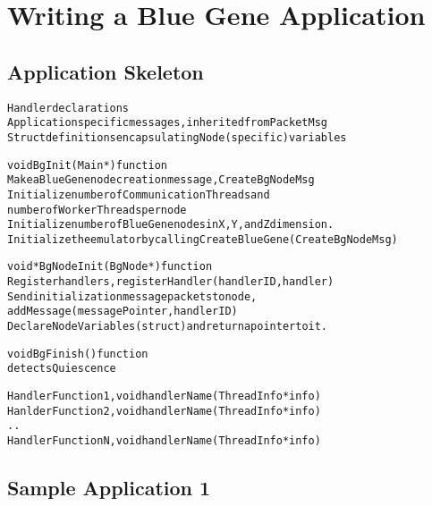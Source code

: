 \documentclass[10pt]{article}
\begin{document}



\section{Writing a Blue Gene Application}

\subsection{Application Skeleton}

\begin{alltt}
Handler declarations
Application specific messages, inherited from PacketMsg
Struct definitions encapsulating Node (specific) variables

void  BgInit(Main *)  function
  Make a Blue Gene node creation message, CreateBgNodeMsg
  Initialize number of Communication Threads and 
    number of Worker Threads per node
  Initialize number of Blue Gene nodes in X, Y, and Z dimension.
  Initialize the emulator by calling CreateBlueGene(CreateBgNodeMsg)

void *BgNodeInit(BgNode *) function
  Register handlers, registerHandler(handlerID, handler)
  Send initialization message packets to node, 
    addMessage(messagePointer, handlerID)
  Declare Node Variables (struct) and return a pointer to it.

void  BgFinish()  function
  detects Quiescence

Handler Function 1, void handlerName(ThreadInfo *info)
Hanlder Function 2, void handlerName(ThreadInfo *info)
..
Handler Function N, void handlerName(ThreadInfo *info)

\end{alltt}

\subsection{Sample Application 1}
\end{document}
